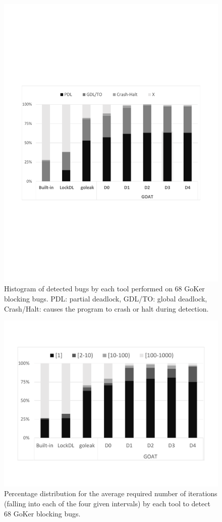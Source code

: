 \begin{figure}
\centering
  \includegraphics[width=.85\linewidth]{goat/figs/P4_detections.pdf}
  \caption{Histogram of detected bugs by each tool performed on 68 GoKer blocking bugs. PDL: partial deadlock, GDL/TO: global deadlock, Crash/Halt: causes the program to crash or halt during detection.}
  \label{fig:detection}
\end{figure}


\begin{figure}
\centering
  \includegraphics[width=.85\linewidth]{goat/figs/P4_runs2.pdf}
  \caption{Percentage distribution for the average required number of iterations (falling into each of the four given intervals) by each tool to detect 68 GoKer blocking bugs.}
  \label{fig:runs}
\end{figure}


